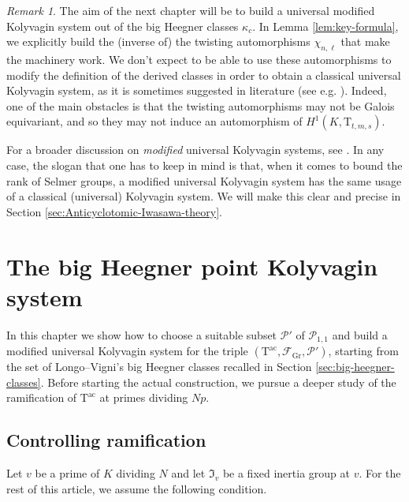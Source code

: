 \documentclass[12pt,reqno]{amsart}
\theoremstyle{definition}
\theoremstyle{remark}
\newtheorem{remark}[theorem]{Remark}
\newcommand{\T}{\boldsymbol{\mathrm{T}}}
\newcommand{\ac}{\mathrm{ac}}
\newcommand{\Gr}{\mathrm{Gr}}
\begin{document}
\begin{remark}
    The aim of the next chapter will be to build a universal modified Kolyvagin system out of the big Heegner classes $\kappa_c$. In Lemma \ref{lem:key-formula}, we explicitly build the (inverse of) the twisting automorphisms $\chi_{n,\ell}$ that make the machinery work. We don't expect to be able to use these automorphisms to modify the definition of the derived classes in order to obtain a classical universal Kolyvagin system, as it is sometimes suggested in literature (see e.g. \cite[proof of Theorem 1.7.5]{Howard04:heegner-point-kolyvagin-system}). Indeed, one of the main obstacles is that the twisting automorphisms may not be Galois equivariant, and so they may not induce an automorphism of $H^1(K,\T_{t,m,s})$.
    
    For a broader discussion on \emph{modified} universal Kolyvagin systems, see \cite[§2.7]{mastella-zerman2025:anticyclotomic}. In any case, the slogan that one has to keep in mind is that, when it comes to bound the rank of Selmer groups, a modified universal Kolyvagin system has the same usage of a classical (universal) Kolyvagin system. We will make this clear and precise in Section \ref{sec:Anticyclotomic-Iwasawa-theory}.
\end{remark}



\section{The big Heegner point Kolyvagin system}\label{sec:the-big-heegner-point-kolyvagin-system}

In this chapter we show how to choose a suitable subset $\mathcal{P}'$ of $\mathcal{P}_{1,1}$ and build a modified universal Kolyvagin system for the triple $(\T^{\ac},\mathcal{F}_{\Gr},\mathcal{P}')$, starting from the set of Longo--Vigni's big Heegner classes recalled in Section \ref{sec:big-heegner-classes}. Before starting the actual construction, we pursue a deeper study of the ramification of  $\T^{\ac}$ at primes dividing $Np$.

\subsection{Controlling ramification}\label{sec:controlling-ramification}

Let $v$ be a prime of $K$ dividing $N$ and let $\mathfrak{I}_v$ be a fixed inertia group at $v$. For the rest of this article, we assume the following condition.
\end{document}
